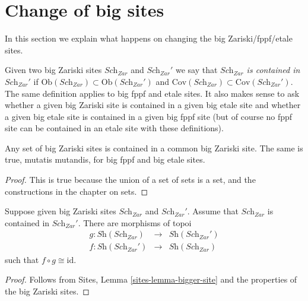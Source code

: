 \section{Change of big sites}
\label{section-change-alpha}

\noindent
In this section we explain what happens on changing the big
Zariski/fppf/etale sites.

\medskip\noindent
Given two big Zariski sites $\textit{Sch}_{Zar}$ and
$\textit{Sch}_{Zar}'$ we say that {\it $\textit{Sch}_{Zar}$ is contained in
$\textit{Sch}_{Zar}'$} if
$\text{Ob}(\textit{Sch}_{Zar}) \subset \text{Ob}(\textit{Sch}_{Zar}')$
and
$\text{Cov}(\textit{Sch}_{Zar}) \subset \text{Cov}(\textit{Sch}_{Zar}')$.
The same definition applies to big fppf and etale sites. It also makes
sense to ask whether a given big Zariski site is contained in a
given big etale site and whether a given big etale site is contained in a
given big fppf site (but of course no fppf site can be contained in an
etale site with these definitions).

\begin{lemma}
\label{lemma-contained-in}
Any set of big Zariski sites is contained in a common big Zariski site.
The same is true, mutatis mutandis, for big fppf and big etale sites.
\end{lemma}

\begin{proof}
This is true because the union of a set of sets is a set, and the
constructions in the chapter on sets.
\end{proof}

\begin{lemma}
\label{lemma-change-alpha-Zariski}
Suppose given big Zariski sites $\textit{Sch}_{Zar}$ and
$\textit{Sch}_{Zar}'$. Assume that $\textit{Sch}_{Zar}$
is contained in $\textit{Sch}_{Zar}'$. There are morphisms of
topoi
\begin{eqnarray*}
g : \textit{Sh}(\textit{Sch}_{Zar}) &
\longrightarrow &
\textit{Sh}(\textit{Sch}_{Zar}') \\
f : \textit{Sh}(\textit{Sch}_{Zar}') &
\longrightarrow &
\textit{Sh}(\textit{Sch}_{Zar})
\end{eqnarray*}
such that $f \circ g \cong \text{id}$.
\end{lemma}

\begin{proof}
Follows from Sites, Lemma \ref{sites-lemma-bigger-site} and the properties of
the big Zariski sites.
\end{proof}












